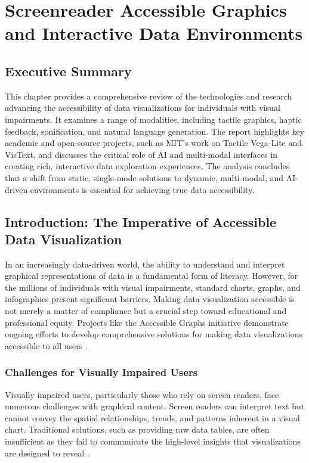 \chapter{Screenreader Accessible Graphics and Interactive Data Environments}\label{ch13:accessible-graphics}
\raggedright

\section{Executive Summary}\label{ch13:sec:executive-summary}
This chapter provides a comprehensive review of the technologies and research advancing the accessibility of data visualizations for individuals with visual impairments. It examines a range of modalities, including tactile graphics, haptic feedback, sonification, and natural language generation. The report highlights key academic and open-source projects, such as MIT's work on Tactile Vega-Lite and VisText, and discusses the critical role of AI and multi-modal interfaces in creating rich, interactive data exploration experiences. The analysis concludes that a shift from static, single-mode solutions to dynamic, multi-modal, and AI-driven environments is essential for achieving true data accessibility.

\section{Introduction: The Imperative of Accessible Data Visualization}\label{ch13:sec:introduction}
In an increasingly data-driven world, the ability to understand and interpret graphical representations of data is a fundamental form of literacy. However, for the millions of individuals with visual impairments, standard charts, graphs, and infographics present significant barriers. Making data visualization accessible is not merely a matter of compliance but a crucial step toward educational and professional equity. Projects like the Accessible Graphs initiative demonstrate ongoing efforts to develop comprehensive solutions for making data visualizations accessible to all users \supercite{AccessibleGraphs, AccessVizWorkshop}.

\subsection{Challenges for Visually Impaired Users}\label{ch13:ssec:challenges}
Visually impaired users, particularly those who rely on screen readers, face numerous challenges with graphical content. Screen readers can interpret text but cannot convey the spatial relationships, trends, and patterns inherent in a visual chart. Traditional solutions, such as providing raw data tables, are often insufficient as they fail to communicate the high-level insights that visualizations are designed to reveal \supercite{Lundgard2021, Zewe2021Making}.

